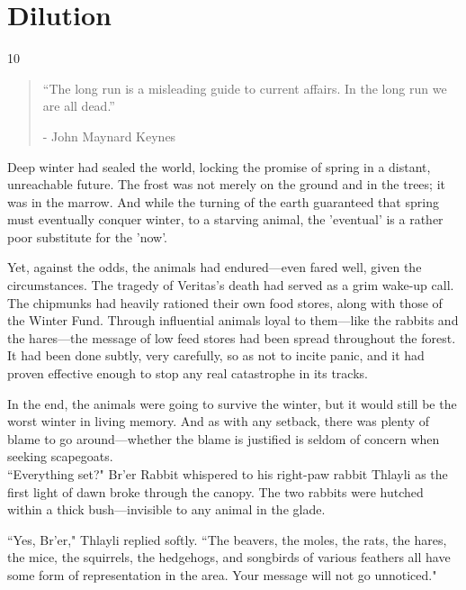 \chapter{Dilution}

\vspace{-1.3cm}
\begin{localsize}{10}
    \begin{quote}
        “The long run is a misleading guide to current affairs. In the long run we are all dead.”
        \begin{flushright}- John Maynard Keynes \end{flushright}
    \end{quote}
\end{localsize}
\vspace{1cm}

Deep winter had sealed the world, locking the promise of spring in a distant, unreachable future.
The frost was not merely on the ground and in the trees; it was in the marrow.
And while the turning of the earth guaranteed that spring must eventually conquer winter, to a starving animal, the 'eventual' is a rather poor substitute for the 'now'.

Yet, against the odds, the animals had endured---even fared well, given the circumstances.
The tragedy of Veritas's death had served as a grim wake-up call.
The chipmunks had heavily rationed their own food stores, along with those of the Winter Fund.
Through influential animals loyal to them---like the rabbits and the hares---the message of low feed stores had been spread throughout the forest.
It had been done subtly, very carefully, so as not to incite panic, and it had proven effective enough to stop any real catastrophe in its tracks.

In the end, the animals were going to survive the winter, but it would still be the worst winter in living memory.
And as with any setback, there was plenty of blame to go around---whether the blame is justified is seldom of concern when seeking scapegoats.\\

``Everything set?" Br'er Rabbit whispered to his right-paw rabbit Thlayli as the first light of dawn broke through the canopy.
The two rabbits were hutched within a thick bush---invisible to any animal in the glade.

``Yes, Br'er," Thlayli replied softly.
``The beavers, the moles, the rats, the hares, the mice, the squirrels, the hedgehogs, and songbirds of various feathers all have some form of representation in the area.
Your message will not go unnoticed."

